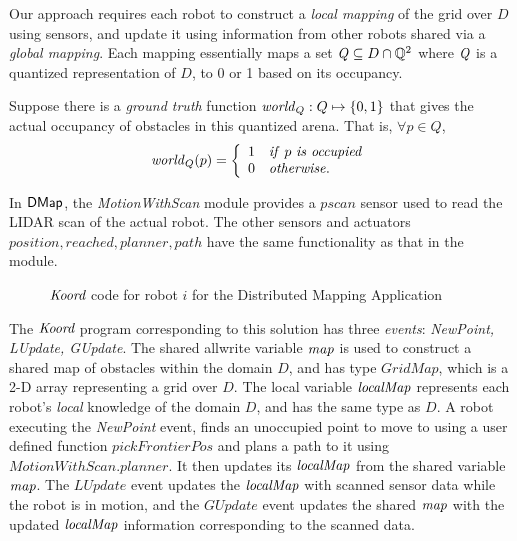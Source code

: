  Our approach requires each robot to construct a \emph{local mapping} of the grid over $D$ using sensors, and update it using information from other robots shared via a \emph{global mapping}. Each mapping essentially maps a set $\mathit{Q} \subseteq D \cap \mathbb{Q}^2$ where $\mathit{Q}$ is a quantized representation of $D$, to 0 or 1 based on its occupancy.

Suppose there is a \emph{ground truth} function $\mathit{world}_Q : Q \mapsto \left\{0,1\right\}$ that gives the actual occupancy of obstacles in this quantized arena. That is, $\forall p \in Q$,
\begin{align}
\mathit{world}_Q(p) =
        \left\{
        \begin{array}{ll}
            1 & \mathit{if}\ p \ \mathit{is \ occupied}\\
            0 & \mathit{otherwise}.
        \end{array}
        \right.
\end{align}

\newcommand{\MotionWithScan}{\emph{MotionWithScan}\xspace}

In ${\sf DMap}$, the \MotionWithScan module provides a $\mathit{pscan}$ sensor used to read the LIDAR scan of the actual robot. The other sensors and actuators $\mathit{position,reached,planner,path}$ have the same functionality as that in the \Motion module.

\begin{figure}[t]
    {
    
    }
    {
    
    }
    \caption{ $\emph{Koord}$ code for robot $i$ for the Distributed Mapping Application}
    \label{fig:mapapp }
    \vspace{-5mm}
\end{figure}

 The $\emph{Koord}$ program corresponding to this solution has three \emph{events}: \emph{NewPoint, LUpdate, GUpdate}. The shared allwrite variable $\mathit{map}$ is used to construct a shared map of obstacles within the domain $D$, and has type $\mathit{GridMap}$, which is a 2-D array representing a grid over $D$. The local variable $\mathit{localMap}$ represents each robot's \emph{local} knowledge of the domain $D$, and has the same type as $D$. A robot executing the \emph{NewPoint} event, finds an unoccupied point to move to using a user defined function $\mathit{pickFrontierPos}$ and plans a path to it using $\mathit{MotionWithScan.planner}$. It then updates its $\mathit{localMap}$ from the shared variable $\mathit{map}$. The $\mathit{LUpdate}$ event updates the $\mathit{localMap}$ with scanned sensor data while the robot is in motion, and the $\mathit{GUpdate}$ event updates the shared $\mathit{map}$ with the updated $\mathit{localMap}$ information corresponding to the scanned data.

